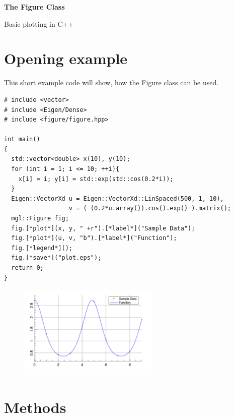\documentclass[a4paper]{article}
\begin{document}
\begin{center}
  \begin{huge}
    \textbf{The Figure Class\\}
  \end{huge}
  Basic plotting in C++
\end{center}
  
\vspace*{3cm}
  \tableofcontents
\vspace*{\fill}


\section{Opening example}

This short example code will show, how the Figure class can be used.
\begin{lstlisting}
# include <vector>
# include <Eigen/Dense>
# include <figure/figure.hpp>

int main()
{
  std::vector<double> x(10), y(10);
  for (int i = 1; i <= 10; ++i){ 
    x[i] = i; y[i] = std::exp(std::cos(0.2*i));
  }
  Eigen::VectorXd u = Eigen::VectorXd::LinSpaced(500, 1, 10),
                  v = ( (0.2*u.array()).cos().exp() ).matrix();
  mgl::Figure fig;
  fig.[*plot*](x, y, " +r").[*label*]("Sample Data");
  fig.[*plot*](u, v, "b").[*label*]("Function");
  fig.[*legend*]();
  fig.[*save*]("plot.eps");
  return 0;
}
\end{lstlisting}

\begin{figure}[h]
  \centering
  \includegraphics[width=0.6\textwidth]{opening-example.pdf}
  \thispagestyle{empty}
\end{figure}

\restoregeometry
\section{Methods}
\end{document}
